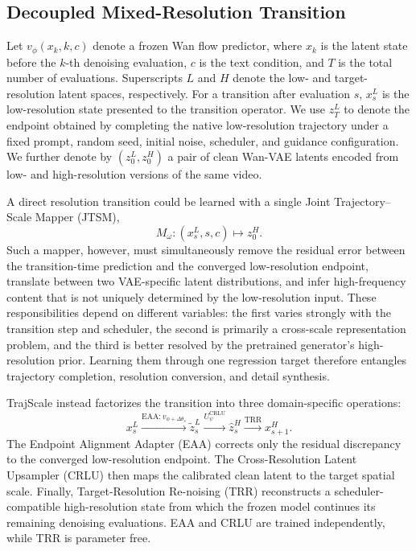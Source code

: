 \subsection{Decoupled Mixed-Resolution Transition}
\label{sec:decoupled_transition}

Let \(v_\phi(x_k,k,c)\) denote a frozen Wan flow predictor, where
\(x_k\) is the latent state before the \(k\)-th denoising evaluation,
\(c\) is the text condition, and \(T\) is the total number of
evaluations. Superscripts \(L\) and \(H\) denote the low- and
target-resolution latent spaces, respectively. For a transition after
evaluation \(s\), \(x_s^L\) is the low-resolution state presented to the
transition operator. We use \(z_T^L\) to denote the endpoint obtained by
completing the native low-resolution trajectory under a fixed prompt,
random seed, initial noise, scheduler, and guidance configuration. We
further denote by \((z_0^L,z_0^H)\) a pair of clean Wan-VAE latents
encoded from low- and high-resolution versions of the same video.

A direct resolution transition could be learned with a single Joint
Trajectory--Scale Mapper (JTSM),
\[
M_\omega:(x_s^L,s,c)\mapsto z_0^H.
\]
Such a mapper, however, must simultaneously remove the residual error
between the transition-time prediction and the converged low-resolution
endpoint, translate between two VAE-specific latent distributions, and
infer high-frequency content that is not uniquely determined by the
low-resolution input. These responsibilities depend on different
variables: the first varies strongly with the transition step and
scheduler, the second is primarily a cross-scale representation problem,
and the third is better resolved by the pretrained generator's
high-resolution prior. Learning them through one regression target
therefore entangles trajectory completion, resolution conversion, and
detail synthesis.

TrajScale instead factorizes the transition into three domain-specific
operations:
\[
x_s^L
\xrightarrow{\mathrm{EAA}:v_{\phi+\Delta\theta_s}}
\widetilde z_s^L
\xrightarrow{U_\psi^{\mathrm{CRLU}}}
\widehat z_s^H
\xrightarrow{\mathrm{TRR}}
x_{s+1}^H.
\]
The Endpoint Alignment Adapter (EAA) corrects only the residual discrepancy
to the converged low-resolution endpoint. The Cross-Resolution Latent
Upsampler (CRLU) then maps the calibrated clean latent to the target
spatial scale. Finally, Target-Resolution Re-noising (TRR) reconstructs a
scheduler-compatible high-resolution state from which the frozen model
continues its remaining denoising evaluations. EAA and CRLU are trained
independently, while TRR is parameter free.

